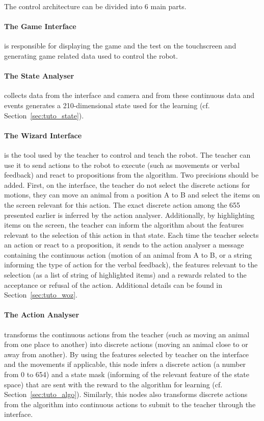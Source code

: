 
The control architecture can be divided into 6 main parts.

\paragraph{The Game Interface} is responsible for displaying the game and the test on the touchscreen and generating game related data used to control the robot.

\paragraph{The State Analyser} collects data from the interface and camera and from these continuous data and events generates a 210-dimensional state used for the learning (cf. Section~\ref{sec:tuto_state}).

\paragraph{The Wizard Interface} is the tool used by the teacher to control and teach the robot. The teacher can use it to send actions to the robot to execute (such as movements or verbal feedback) and react to propositions from the algorithm. Two precisions should be added. First, on the interface, the teacher do not select the discrete actions for motions, they can move an animal from a position A to B and select the items on the screen relevant for this action. The exact discrete action among the 655 presented earlier is inferred by the action analyser. Additionally, by highlighting items on the screen, the teacher can inform the algorithm about the features relevant to the selection of this action in that state. Each time the teacher selects an action or react to a proposition, it sends to the action analyser a message containing the continuous action (motion of an animal from A to B, or a string informing the type of action for the verbal feedback), the features relevant to the selection (as a list of string of highlighted items) and a rewards related to the acceptance or refusal of the action. Additional details can be found in Section~\ref{sec:tuto_woz}. 

\paragraph{The Action Analyser} transforms the continuous actions from the teacher (such as moving an animal from one place to another) into discrete actions (moving an animal close to or away from another). By using the features selected by teacher on the interface and the movements if applicable, this node infers a discrete action (a number from 0 to 654) and a state mask (informing of the relevant feature of the state space) that are sent with the reward to the algorithm for learning (cf. Section~\ref{sec:tuto_algo}). Similarly, this nodes also transforms discrete actions from the algorithm into continuous actions to submit to the teacher through the interface.

